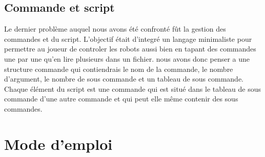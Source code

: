 \documentclass[a4paper, 11pt]{article}
\begin{document}
\subsection{Commande et script}
Le dernier problème auquel nous avons été confronté fût la gestion des commandes et du script. L'objectif était d'integré un langage minimaliste pour permettre au joueur de controler les robots aussi bien en tapant des commandes une par une qu'en lire plusieurs dans un fichier.
nous avons donc penser a une structure commande qui contiendrais le nom de la commande, le nombre d'argument, le nombre de sous commande et un tableau de sous commande. Chaque élément du script est une commande qui est situé dans le tableau de sous commande d'une autre commande et qui peut elle même contenir des sous commandes.\\


\newpage
\section{Mode d'emploi}
\end{document}
